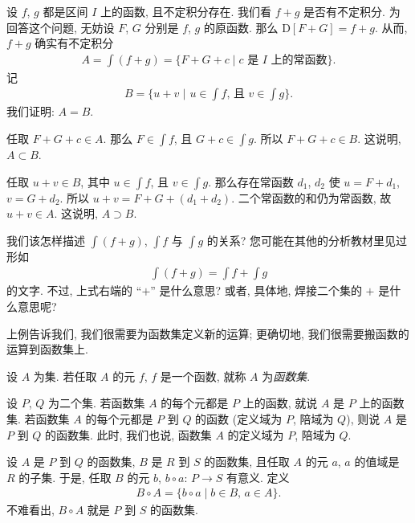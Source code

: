 \begin{example}
    设 $f$, $g$ 都是区间 $I$ 上的函数, 且不定积分存在.
    我们看 $f + g$ 是否有不定积分.
    为回答这个问题, 无妨设 $F$, $G$ 分别是 $f$, $g$ 的原函数.
    那么 $\mathrm{D}[F + G] = f + g$.
    从而, $f + g$ 确实有不定积分
    \begin{align*}
        A = \int {(f + g)} = \{ F + G + c \mid \text{$c$ 是 $I$ 上的常函数} \}.
    \end{align*}
    记
    \begin{align*}
        B = \Bigg\{ u + v \,\,\Bigg|\,\, \text{$u \in \int {f}$, 且 $v \in \int {g}$} \Bigg\}.
    \end{align*}
    我们证明: $A = B$.

    任取 $F + G + c \in A$.
    那么 $F \in \int {f}$, 且 $G + c \in \int {g}$.
    所以 $F + G + c \in B$.
    这说明, $A \subset B$.

    任取 $u + v \in B$,
    其中 $u \in \int {f}$, 且 $v \in \int {g}$.
    那么存在常函数 $d_1$, $d_2$ 使
    $u = F + d_1$, $v = G + d_2$.
    所以 $u + v = F + G + (d_1 + d_2)$.
    二个常函数的和仍为常函数, 故 $u + v \in A$.
    这说明, $A \supset B$.

    我们该怎样描述
    $\int {(f + g)}$, $\int {f}$ 与 $\int {g}$ 的关系?
    您可能在其他的分析教材里见过形如
    \begin{align*}
        \int {(f + g)} = \int {f} + \int {g}
    \end{align*}
    的文字.
    不过, 上式右端的 ``$+$'' 是什么意思?
    或者, 具体地, 焊接二个集的 $+$ 是什么意思呢?
\end{example}

上例告诉我们, 我们很需要为函数集定义新的运算;
更确切地, 我们很需要搬函数的运算到函数集上.

\begin{definition}
    设 $A$ 为集.
    若任取 $A$ 的元 $f$, $f$ 是一个函数,
    就称 $A$ 为\emph{函数集}.

    设 $P$, $Q$ 为二个集.
    若函数集 $A$ 的每个元都是 $P$ 上的函数,
    就说 $A$ 是 $P$ 上的函数集.
    若函数集 $A$ 的每个元都是 $P$ 到 $Q$ 的函数
    (定义域为 $P$, 陪域为 $Q$),
    则说 $A$ 是 $P$ 到 $Q$ 的函数集.
    此时, 我们也说,
    函数集 $A$ 的定义域为 $P$, 陪域为 $Q$.
\end{definition}

\begin{definition}
    设 $A$ 是 $P$ 到 $Q$ 的函数集,
    $B$ 是 $R$ 到 $S$ 的函数集,
    且任取 $A$ 的元 $a$, $a$ 的值域是 $R$ 的子集.
    于是, 任取 $B$ 的元 $b$, $b \circ a$: $P \to S$ 有意义.
    定义
    \begin{align*}
        B \circ A = \{ b \circ a \mid \text{$b \in B$, $a \in A$} \}.
    \end{align*}
    不难看出, $B \circ A$ 就是 $P$ 到 $S$ 的函数集.
\end{definition}

